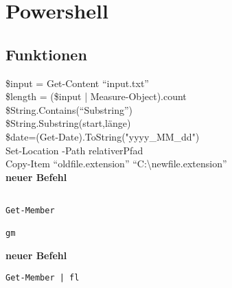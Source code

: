 \chapter{Powershell}\label{chap:Powershell}
\section{Funktionen}
\$input = Get-Content \enquote{input.txt}\\
\$length = (\$input | Measure-Object).count\\
\$String.Contains(\enquote{Substring})\\
\$String.Substring(start,länge)\\
\$date=(Get-Date).ToString("yyyy\_MM\_dd")\\
Set-Location -Path relativerPfad\\
Copy-Item \enquote{oldfile.extension} \enquote{C:\textbackslash newfile.extension}\\

\textbf{neuer Befehl}\begin{lstlisting}

Get-Member

gm

\end{lstlisting}
\textbf{neuer Befehl}\begin{lstlisting}Get-Member | fl
\end{lstlisting}